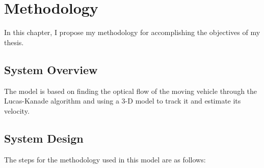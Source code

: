 \documentclass[a4paper]{aitthesis}
\begin{document}
\chapter{Methodology} \label{methodology}
In this chapter, I propose my methodology for accomplishing the objectives of my thesis. 

\section{System Overview}
The model is based on finding the optical flow of the moving vehicle through the Lucas-Kanade algorithm and using a 3-D model to track it and estimate its velocity.



\section{System Design}
The steps for the methodology used in this model are as follows:
\end{document}
